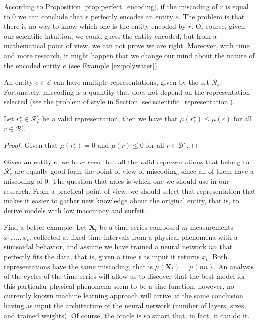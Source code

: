 According to Proposition \ref{prop:perfect_encoding}, if the miscoding of $r$ is equal to 0 we can conclude that $r$ perfectly encodes an entity $e$. The problem is that there is no way to know which one is the entity encoded by $r$. Of course, given our scientific intuition, we could guess the entity encoded, but from a mathematical point of view, we can not prove we are right. Moreover, with time and more research, it might happen that we change our mind about the nature of the encoded entity $e$ (see Example \ref{ex:polywater}).

An entity $e \in \mathcal{E}$ can have multiple representations, given by the set $\mathcal{R}_e$. Fortunately, miscoding is a quantity that does not depend on the representation selected (see the problem of style in Section \ref{sec:scientific_representation}).

\begin{proposition}
Let $r^\star_e \in \mathcal{R}^\star_\mathcal{E}$ be a valid representation, then we have that $\mu\left( r^\star_e \right) \leq \mu\left( r \right)$ for all $r \in \mathcal{B}^\star$.
\end{proposition}
\begin{proof}
Given that $\mu\left( r^\star_e \right) = 0$ and $\mu\left( r \right) \leq 0$ for all $r \in \mathcal{B}^\star$.
\end{proof}

Given an entity $e$, we have seen that all the valid representations that belong to $\mathcal{R}^\star_e$ are equally good form the point of view of miscoding, since all of them have a miscoding of $0$. The question that aries is which one we should use in our research. From a practical point of view, we should select that representation that makes it easier to gather new knowledge about the original entity, that is, to derive models with low inaccuracy and surfeit.

\begin{example}
{\color{red} Find a better example.} Let $\mathbf{X}_t$ be a time series composed $m$ measurements $x_1, \ldots, x_m$ collected at fixed time intervals from a physical phenomena with a sinusoidal behavior, and assume we have trained a neural network $nn$ that perfectly fits the data, that is, given a time $t$ as input it returns $x_t$. Both representations have the same miscoding, that is $\mu(\mathbf{X}_t) = \mu(nn)$. An analysis of the cycles of the time series will allow us to discover that the best model for this particular physical phenomena seem to be a sine function, however, no currently known machine learning approach will arrive at the same conclusion having as input the architecture of the neural network (number of layers, sizes, and trained weights). Of course, the oracle is so smart that, in fact, it can do it.
\end{example}

